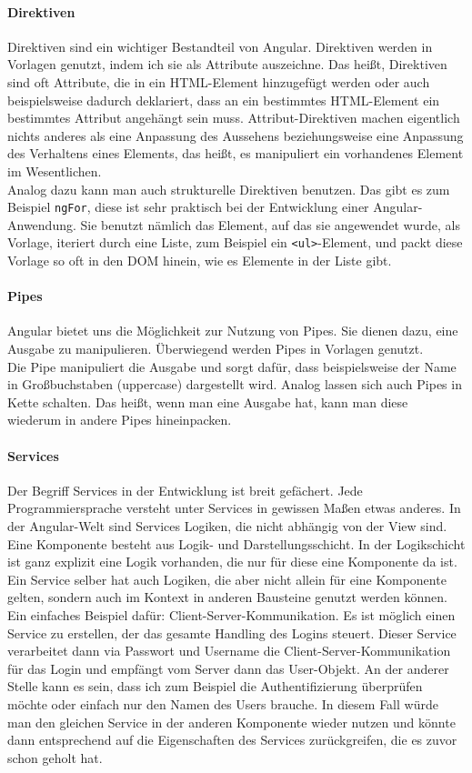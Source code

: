 \paragraph{Direktiven}
%
Direktiven sind ein wichtiger Bestandteil von Angular. Direktiven werden in Vorlagen genutzt, indem ich sie als Attribute auszeichne. Das heißt, Direktiven sind oft Attribute, die in ein HTML-Element hinzugefügt werden oder auch beispielsweise dadurch deklariert, dass an ein bestimmtes HTML-Element ein bestimmtes Attribut angehängt sein muss. Attribut-Direktiven machen eigentlich nichts anderes als eine Anpassung des Aussehens beziehungsweise eine Anpassung des Verhaltens eines Elements, das heißt, es manipuliert ein vorhandenes Element im Wesentlichen.\\
Analog dazu kann man auch strukturelle Direktiven benutzen. Das gibt es zum Beispiel \texttt{ngFor}, diese ist sehr praktisch bei der Entwicklung einer Angular-Anwendung. Sie benutzt nämlich das Element, auf das sie angewendet wurde, als Vorlage, iteriert durch eine Liste, zum Beispiel ein \texttt{<ul>}-Element, und packt diese Vorlage so oft in den DOM hinein, wie es Elemente in der Liste gibt.
%
\paragraph{Pipes}
%
Angular bietet uns die Möglichkeit zur Nutzung von Pipes. Sie dienen dazu, eine Ausgabe zu manipulieren. Überwiegend werden Pipes in Vorlagen genutzt.\\
Die Pipe manipuliert die Ausgabe und sorgt dafür, dass beispielsweise der Name in Großbuchstaben (uppercase) dargestellt wird. Analog lassen sich auch Pipes in Kette schalten. Das heißt, wenn man eine Ausgabe hat, kann man diese wiederum in andere Pipes hineinpacken.
%
\paragraph{Services}
%
Der Begriff Services in der Entwicklung ist breit gefächert. Jede Programmiersprache versteht unter Services in gewissen Maßen etwas anderes. In der Angular-Welt sind Services Logiken, die nicht abhängig von der View sind. Eine Komponente besteht aus Logik- und Darstellungsschicht. In der Logikschicht ist ganz explizit eine Logik vorhanden, die nur für diese eine Komponente da ist.\\
Ein Service selber hat auch Logiken, die aber nicht allein für eine Komponente gelten, sondern auch im Kontext in anderen Bausteine genutzt werden können. Ein einfaches Beispiel dafür: Client-Server-Kommunikation. Es ist möglich einen Service zu erstellen, der das gesamte Handling des Logins steuert. Dieser Service verarbeitet dann via Passwort und Username die Client-Server-Kommunikation für das Login und empfängt vom Server dann das User-Objekt. An der anderer Stelle kann es sein, dass ich zum Beispiel die Authentifizierung überprüfen möchte oder einfach nur den Namen des Users brauche. In diesem Fall würde man den gleichen Service in der anderen Komponente wieder nutzen und könnte dann entsprechend auf die Eigenschaften des Services zurückgreifen, die es zuvor schon geholt hat.
%
